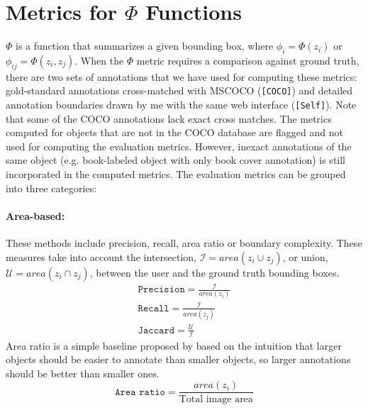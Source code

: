 \documentclass[12pt]{article}
\begin{document}
\section{Metrics for $\Phi$ Functions}
\par $\Phi$ is a function that summarizes a given bounding box, where $\phi_i=\Phi(z_i)$ or $\phi_{ij}=\Phi(z_i,z_j)$. When the $\Phi$ metric requires a comparison against ground truth, there are two sets of annotations that we have used for computing these metrics: gold-standard annotations cross-matched with MSCOCO (\texttt{[COCO]}) and detailed annotation boundaries drawn by me with the same web interface (\texttt{[Self]}). Note that some of the COCO annotations lack exact cross matches. The metrics computed for objects that are not in the COCO database are flagged and not used for computing the evaluation metrics. However, inexact annotations of the same object (e.g. book-labeled object with only book cover annotation) is still incorporated in the computed metrics. The evaluation metrics can be grouped into three categories: 
\paragraph{Area-based: } These methods include precision, recall, area ratio or boundary complexity. These measures take into account the intersection, $\mathcal{I}=area(z_i\cup z_j)$, or union, $\mathcal{U}=area(z_i\cap z_j)$, between the user and the ground truth bounding boxes.
\begin{align}
\texttt{Precision} = \frac{\mathcal{I}}{area(z_i)} \\
\texttt{Recall} = \frac{\mathcal{I}}{area(z_j)} \\
\texttt{Jaccard} = \frac{\mathcal{U}}{\mathcal{I}}
\end{align}
Area ratio is a simple baseline proposed by  \cite{Vittayakorn2011} based on the intuition that larger objects should be easier to annotate than smaller objects, so larger annotations should be better than smaller ones.
\begin{equation}
\texttt{Area ratio}=\frac{area(z_i)}{\text{Total image area}}
\end{equation}
\end{document}
